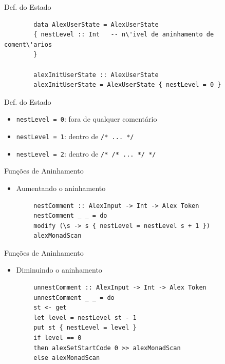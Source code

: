 \begin{frame}[fragile]{Def. do Estado}

    \begin{lstlisting}
        data AlexUserState = AlexUserState
        { nestLevel :: Int   -- n\'ivel de aninhamento de coment\'arios
        }

        alexInitUserState :: AlexUserState
        alexInitUserState = AlexUserState { nestLevel = 0 }
    \end{lstlisting}
\end{frame}

\begin{frame}[fragile]{Def. do Estado}

    \begin{itemize}

        \item
        \texttt{nestLevel = 0}: fora de qualquer comentário
        \item
        \texttt{nestLevel = 1}: dentro de
        \texttt{/* ... */}
        \item
        \texttt{nestLevel = 2}: dentro de
        \texttt{/* /* ... */ */}
    \end{itemize}
\end{frame}

\begin{frame}[fragile]{Funções de Aninhamento}

    \begin{itemize}

        \item
        Aumentando o aninhamento
    \end{itemize}

    \begin{lstlisting}
        nestComment :: AlexInput -> Int -> Alex Token
        nestComment _ _ = do
        modify (\s -> s { nestLevel = nestLevel s + 1 })
        alexMonadScan
    \end{lstlisting}
\end{frame}

\begin{frame}[fragile]{Funções de Aninhamento}

    \begin{itemize}

        \item
        Diminuindo o aninhamento
    \end{itemize}

    \begin{lstlisting}
        unnestComment :: AlexInput -> Int -> Alex Token
        unnestComment _ _ = do
        st <- get
        let level = nestLevel st - 1
        put st { nestLevel = level }
        if level == 0
        then alexSetStartCode 0 >> alexMonadScan
        else alexMonadScan
    \end{lstlisting}
\end{frame}

